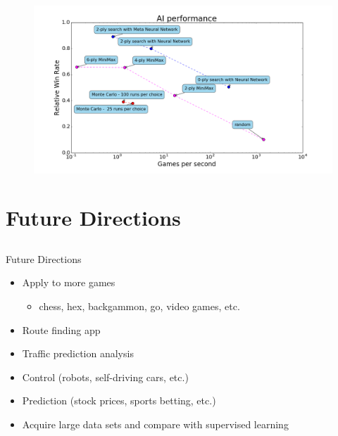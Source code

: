 \begin{frame}
\begin{figure}
\includegraphics[width=1.0 \textwidth]{performance}
\end{figure}
\end{frame}
\section{Future Directions}
\subsection{}
\begin{frame}[c]{Future Directions}\centering
\begin{itemize}
\item Apply to more games
\begin{itemize}
\item chess, hex, backgammon, go, video games, etc.
\end{itemize}
\item Route finding app
\item Traffic prediction analysis
\item Control (robots, self-driving cars, etc.)
\item Prediction (stock prices, sports betting, etc.)
\item Acquire large data sets and compare with supervised learning
\end{itemize}
\end{frame}

